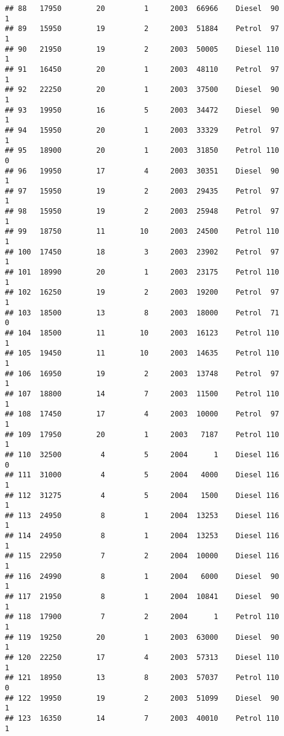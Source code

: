 \documentclass[]{article}
\begin{document}
\begin{verbatim}
## 88   17950        20         1     2003  66966    Diesel  90         1
## 89   15950        19         2     2003  51884    Petrol  97         1
## 90   21950        19         2     2003  50005    Diesel 110         1
## 91   16450        20         1     2003  48110    Petrol  97         1
## 92   22250        20         1     2003  37500    Diesel  90         1
## 93   19950        16         5     2003  34472    Diesel  90         1
## 94   15950        20         1     2003  33329    Petrol  97         1
## 95   18900        20         1     2003  31850    Petrol 110         0
## 96   19950        17         4     2003  30351    Diesel  90         1
## 97   15950        19         2     2003  29435    Petrol  97         1
## 98   15950        19         2     2003  25948    Petrol  97         1
## 99   18750        11        10     2003  24500    Petrol 110         1
## 100  17450        18         3     2003  23902    Petrol  97         1
## 101  18990        20         1     2003  23175    Petrol 110         1
## 102  16250        19         2     2003  19200    Petrol  97         1
## 103  18500        13         8     2003  18000    Petrol  71         0
## 104  18500        11        10     2003  16123    Petrol 110         1
## 105  19450        11        10     2003  14635    Petrol 110         1
## 106  16950        19         2     2003  13748    Petrol  97         1
## 107  18800        14         7     2003  11500    Petrol 110         1
## 108  17450        17         4     2003  10000    Petrol  97         1
## 109  17950        20         1     2003   7187    Petrol 110         1
## 110  32500         4         5     2004      1    Diesel 116         0
## 111  31000         4         5     2004   4000    Diesel 116         1
## 112  31275         4         5     2004   1500    Diesel 116         1
## 113  24950         8         1     2004  13253    Diesel 116         1
## 114  24950         8         1     2004  13253    Diesel 116         1
## 115  22950         7         2     2004  10000    Diesel 116         1
## 116  24990         8         1     2004   6000    Diesel  90         1
## 117  21950         8         1     2004  10841    Diesel  90         1
## 118  17900         7         2     2004      1    Petrol 110         1
## 119  19250        20         1     2003  63000    Diesel  90         1
## 120  22250        17         4     2003  57313    Diesel 110         1
## 121  18950        13         8     2003  57037    Petrol 110         0
## 122  19950        19         2     2003  51099    Diesel  90         1
## 123  16350        14         7     2003  40010    Petrol 110         1

\end{verbatim}
\end{document}

